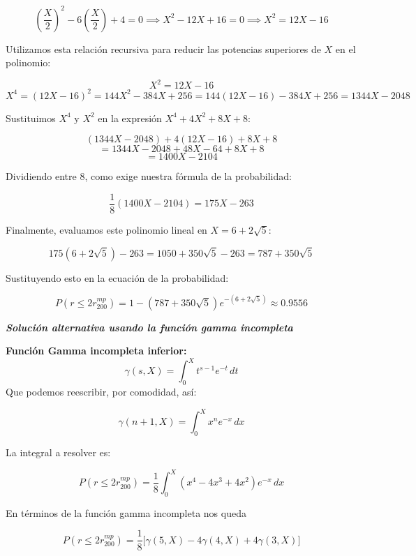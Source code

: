 \documentclass[a4paper]{article}
\begin{document}
\begin{enumerate}[a)]
$$ \left(\frac{X}{2}\right)^2 - 6\left(\frac{X}{2}\right) + 4 = 0 \implies X^2 - 12X + 16 = 0 \implies X^2 = 12X - 16 $$

Utilizamos esta relación recursiva para reducir las potencias superiores de $X$ en el polinomio:

$$ X^2 = 12X - 16 $$
$$ X^4 = (12X - 16)^2 = 144X^2 - 384X + 256 = 144(12X - 16) - 384X + 256 = 1344X - 2048 $$

Sustituimos $X^4$ y $X^2$ en la expresión $X^4 + 4X^2 + 8X + 8$:

$$ (1344X - 2048) + 4(12X - 16) + 8X + 8 $$
$$ = 1344X - 2048 + 48X - 64 + 8X + 8 $$
$$ = 1400X - 2104 $$

Dividiendo entre 8, como exige nuestra fórmula de la probabilidad:

$$ \frac{1}{8} (1400X - 2104) = 175X - 263 $$

Finalmente, evaluamos este polinomio lineal en $X = 6 + 2\sqrt{5}$:

$$ 175(6 + 2\sqrt{5}) - 263 = 1050 + 350\sqrt{5} - 263 = 787 + 350\sqrt{5} $$

Sustituyendo esto en la ecuación de la probabilidad:

$$ P(r \leq 2r_{200}^{mp}) = 1 - (787 + 350\sqrt{5}) e^{-(6 + 2\sqrt{5})} \approx 0.9556$$


\textbf{\textit{Solución alternativa usando la función gamma incompleta}}

\textbf{Función Gamma incompleta inferior:}
    $$ \gamma(s, X) = \int_0^X t^{s-1} e^{-t} \, dt $$
Que podemos reescribir, por comodidad, así:

$$ \gamma(n+1, X) = \int_0^X x^n e^{-x} \, dx $$

La integral a resolver es:

$$P(r \leq 2r_{200}^{mp}) =  \frac{1}{8} \int_{0}^{X} (x^4 - 4x^3 + 4x^2)e^{-x} \, dx$$

En términos de la función gamma incompleta nos queda

$$ P(r \leq 2r_{200}^{mp}) = \frac{1}{8} \Big[ \gamma(5, X) - 4\gamma(4, X) + 4\gamma(3, X) \Big] $$


\end{enumerate}
\end{document}
